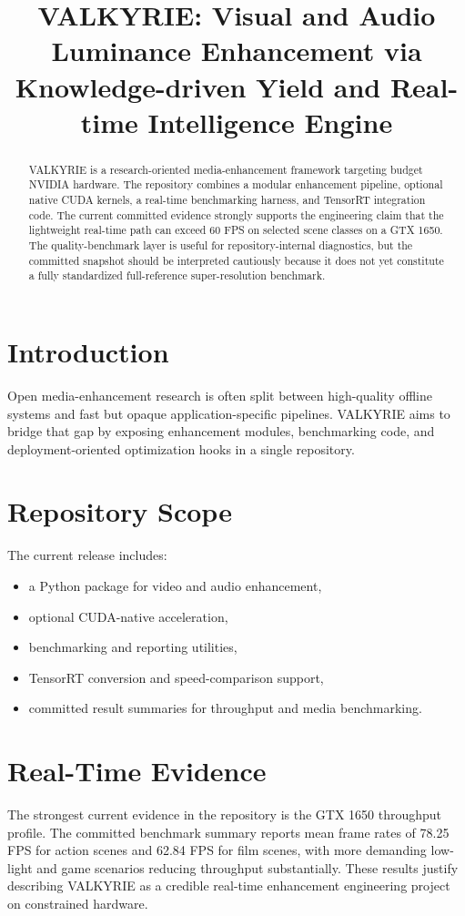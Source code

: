 \documentclass[conference]{IEEEtran}
\title{VALKYRIE: Visual and Audio Luminance Enhancement via Knowledge-driven Yield and Real-time Intelligence Engine}
\author{\IEEEauthorblockN{George David Tsitlauri}
\IEEEauthorblockA{\textit{Dept. of Informatics \& Telecommunications}\\
\textit{University of Thessaly, Greece}\\
 gdtsitlauri@gmail.com}}
\begin{document}
\maketitle

\begin{abstract}
VALKYRIE is a research-oriented media-enhancement framework targeting budget NVIDIA hardware. The repository combines a modular enhancement pipeline, optional native CUDA kernels, a real-time benchmarking harness, and TensorRT integration code. The current committed evidence strongly supports the engineering claim that the lightweight real-time path can exceed 60 FPS on selected scene classes on a GTX 1650. The quality-benchmark layer is useful for repository-internal diagnostics, but the committed snapshot should be interpreted cautiously because it does not yet constitute a fully standardized full-reference super-resolution benchmark.
\end{abstract}

\section{Introduction}
Open media-enhancement research is often split between high-quality offline systems and fast but opaque application-specific pipelines. VALKYRIE aims to bridge that gap by exposing enhancement modules, benchmarking code, and deployment-oriented optimization hooks in a single repository.

\section{Repository Scope}
The current release includes:
\begin{itemize}
\item a Python package for video and audio enhancement,
\item optional CUDA-native acceleration,
\item benchmarking and reporting utilities,
\item TensorRT conversion and speed-comparison support,
\item committed result summaries for throughput and media benchmarking.
\end{itemize}

\section{Real-Time Evidence}
The strongest current evidence in the repository is the GTX 1650 throughput profile. The committed benchmark summary reports mean frame rates of 78.25 FPS for action scenes and 62.84 FPS for film scenes, with more demanding low-light and game scenarios reducing throughput substantially. These results justify describing VALKYRIE as a credible real-time enhancement engineering project on constrained hardware.
\end{document}
